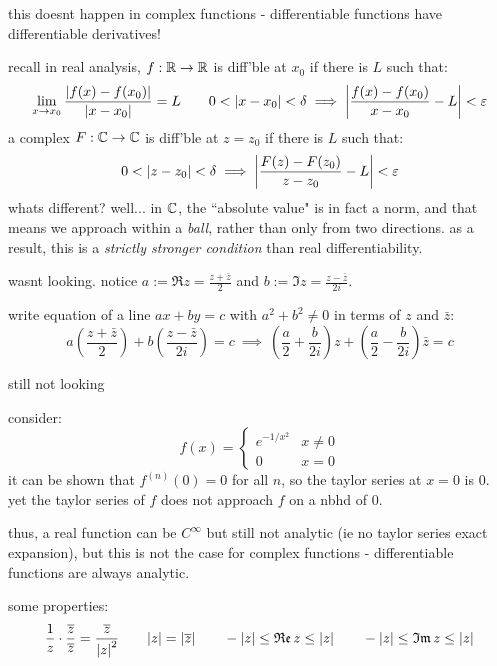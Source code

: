 this doesnt happen in complex functions - differentiable functions have
differentiable derivatives!

recall in real analysis, $f:\mathbb{R}\rightarrow\mathbb{R}$ is diff'ble at $x_{0}$ if there is $L$
such that:
\begin{equation*}
    \lim_{x\rightarrow x_{0}}\frac{\abs{f(x)-f(x_{0})}}{\abs{x-x_{0}}}=L \qquad
    0<\abs{x-x_{0}}<\delta \implies
    \abs{\frac{f(x)-f(x_{0})}{x-x_{0}}-L}<\varepsilon
\end{equation*}
a complex $F:\mathbb{C}\rightarrow\mathbb{C}$ is diff'ble at $z=z_{0}$ if there is $L$ such that:
\begin{equation*}
    0<\abs{z-z_{0}}<\delta \implies \abs{\frac{F(z)-F(z_{0})}{z-z_{0}}-L}<\varepsilon
\end{equation*}
whats different? well... in $\mathbb{C}$, the ``absolute value" is in fact a norm, and
that means we approach within a \textit{ball}, rather than only from two
directions.
as a result, this is a \textit{strictly stronger condition} than real
differentiability.

wasnt looking.
notice $a:=\Re z = \frac{z+\bar{z}}{2}$ and $b:=\Im z = \frac{z-\bar{z}}{2i}$.

\begin{xmp}[source=Primary Source Material]
    write equation of a line $ax+by=c$ with $a^{2}+b^{2}\neq0$ in terms
    of $z$ and $\bar{z}$:
    \begin{equation*}
        a \left( \frac{z+\bar{z}}{2} \right) +
        b \left( \frac{z-\bar{z}}{2i} \right) = c \ \implies \
        \left( \frac{a}{2}+\frac{b}{2i} \right)z +
        \left( \frac{a}{2}-\frac{b}{2i} \right)\bar{z} = c
    \end{equation*}
\end{xmp}

still not looking

consider:
\begin{equation*}
    f(x)=
    \begin{cases}
        e^{-1/x^{2}} & x\neq0 \\ 0 & x = 0
    \end{cases}
\end{equation*}
it can be shown that $f^{(n)}(0)=0$ for all $n$, so the taylor series at $x=0$
is $0$. yet the taylor series of $f$ does not approach $f$ on a nbhd of $0$.

thus, a real function can be $C^{\infty}$ but still not analytic
(ie no taylor series exact expansion), but this is not the case for complex
functions - differentiable functions are always analytic.

some properties:
\begin{equation*}
    \frac{1}{z}\cdot\frac{\overline{z}}{\overline{z}} = \frac{\overline{z}}{\abs{z}^{2}} \qquad
    \abs{z}=\abs{\overline{z}} \qquad -\abs{z}\leq\operatorname{\mathfrak{Re}} z\leq\abs{z} \qquad
    -\abs{z}\leq\operatorname{\mathfrak{Im}} z\leq\abs{z}
\end{equation*}



